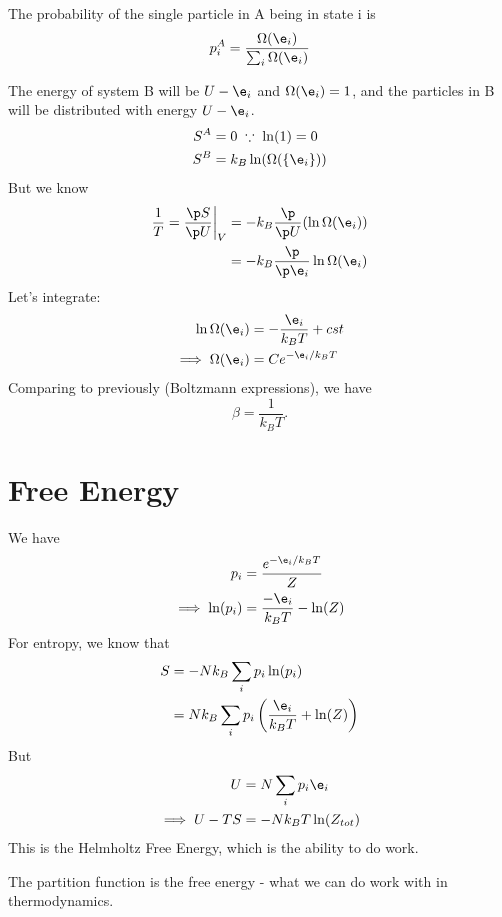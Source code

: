 \documentclass[a4paper, 11pt, normalem]{report}
\begin{document}
The probability of the single particle in A being in state i is
\begin{equation}
    p_i^A = \frac{\Omega(\e_i)}{\sum_i \Omega(\e_i)}
\end{equation}

The energy of system B will be $U - \e_i$ and $\Omega(\e_i) = 1$, and the particles in B will be distributed with energy $U - \e_i$.
\begin{align}
    S^A &= 0 \;\because\; \ln(1) = 0 \\
    S^B &= k_B\ln(\Omega(\{\e_i\}))
\end{align}
But we know
\begin{align}
    \frac{1}{T} = \frac{\p S}{\p U}\bigg|_V &= -k_B\frac{\p}{\p U} (\ln\Omega(\e_i)) \\
                                            &= -k_B\frac{\p}{\p \e_i} \ln\Omega(\e_i)
\end{align}
Let's integrate:
\begin{align}
    \ln\Omega(\e_i) &= -\frac{\e_i}{k_BT} + cst \\
    \implies \Omega(\e_i) &= Ce^{-\e_i/k_BT}
\end{align}
Comparing to previously (Boltzmann expressions), we have
\begin{equation}
    \beta = \frac{1}{k_BT}.
\end{equation}

\section{Free Energy}
We have
\begin{align}
    p_i &= \frac{e^{-\e_i/k_BT}}{Z} \\
    \implies \ln(p_i) &= \frac{-\e_i}{k_BT} - \ln(Z)
\end{align}
For entropy, we know that
\begin{align}
    S &= -Nk_B\sum_i p_i\ln(p_i) \\
      &= Nk_B\sum_ip_i\left(\frac{\e_i}{k_BT} + \ln(Z)\right)
\end{align}
But
\begin{align}
    U &= N\sum_i p_i\e_i \\
    \implies U - TS &= -Nk_BT\ln(Z_{tot})
\end{align}
This is the Helmholtz Free Energy, which is the ability to do work.

The partition function is the free energy - what we can do work with in thermodynamics.
\end{document}

